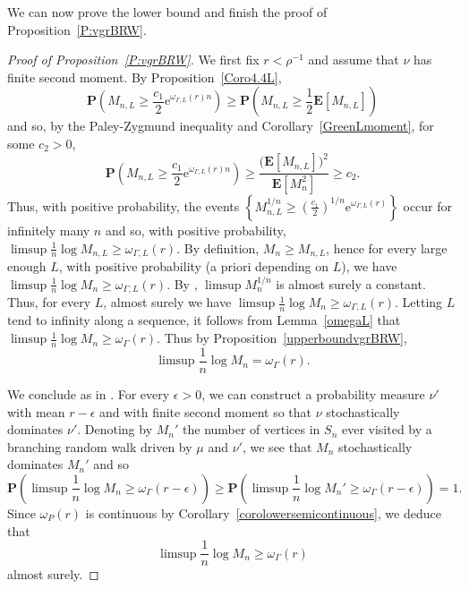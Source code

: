 \documentclass{amsart}
\theoremstyle{definition}
\theoremstyle{remark}
\begin{document}
We can now prove the lower bound and finish the proof of Proposition~\ref{P:vgrBRW}.
\begin{proof}[Proof of Proposition~\ref{P:vgrBRW}]
We first fix $r<\rho^{-1}$ and assume that $\nu$ has finite second moment.
By Proposition~\ref{Coro4.4L},
$$\mathbf{P}\left (M_{n,L}\geq \frac{c_1}{2}\mathrm{e}^{\omega_{\Gamma,L}(r)n}\right)\geq \mathbf{P}\left (M_{n,L}\geq \frac{1}{2}\mathbf{E}[M_{n,L}]\right)$$
and so, by the Paley-Zygmund inequality and Corollary~\ref{GreenLmoment}, for some $c_2>0$,
$$\mathbf{P}\left (M_{n,L}\geq \frac{c_1}{2}\mathrm{e}^{\omega_{\Gamma,L}(r)n}\right)\geq \frac{\big(\mathbf{E}[M_{n,L}]\big)^2}{\mathbf{E}\left[M_n^2\right]}\geq c_2.$$
Thus, with positive probability,
the events $\left\{M_{n,L}^{1/n}\geq \left(\frac{c_1}{2}\right)^{1/n}\mathrm{e}^{\omega_{\Gamma,L}(r)}\right\}$
occur for infinitely many $n$ and so, with positive probability, $\limsup \frac{1}{n}\log M_{n,L}\geq \omega_{\Gamma,L}(r)$.
By definition, $M_n\geq M_{n,L}$,
hence for every large enough $L$, with positive probability (a priori depending on $L$), we have
$\limsup \frac{1}{n}\log M_n\geq \omega_{\Gamma,L}(r)$.
By \cite[Lemma~4.7]{SWX}, $\limsup M_n^{1/n}$ is almost surely a constant.
Thus, for every $L$, almost surely we have
$\limsup \frac{1}{n}\log M_n\geq \omega_{\Gamma,L}(r)$.
Letting $L$ tend to infinity along a sequence, it follows from Lemma~\ref{omegaL} that
$\limsup \frac{1}{n}\log M_n\geq \omega_{\Gamma}(r)$.
Thus by Proposition~\ref{upperboundvgrBRW},
$$\limsup \frac{1}{n} \log M_n=\omega_\Gamma(r).$$


We conclude as in \cite{SWX}.
For every $\epsilon>0$, we can construct a probability measure $\nu'$ with mean $r-\epsilon$ and with finite second moment so that $\nu$ stochastically dominates $\nu'$.
Denoting by $M_n'$ the number of vertices in $S_n$ ever visited by a branching random walk driven by $\mu$ and $\nu'$, we see that $M_n$ stochastically dominates $M_n'$ and so
$$\mathbf{P}\left(\limsup \frac{1}{n}\log M_n\geq \omega_\Gamma(r-\epsilon)\right)\geq \mathbf{P}\left(\limsup \frac{1}{n}\log M_n'\geq \omega_\Gamma(r-\epsilon)\right)=1.$$
Since $\omega_P(r)$ is continuous by Corollary~\ref{corolowersemicontinuous}, we deduce that
$$\limsup \frac{1}{n} \log M_n\geq \omega_\Gamma(r)$$ almost surely.
\end{proof}








 
\end{document}
